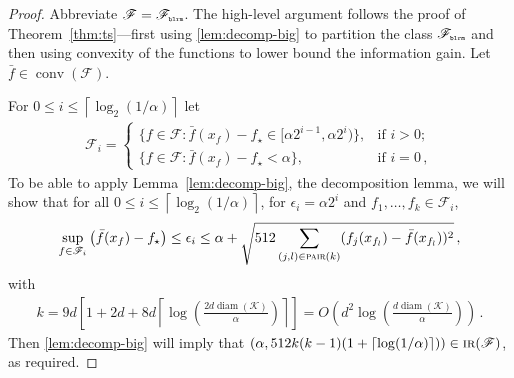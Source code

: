 \documentclass[letter, 12pt]{report}
\newcommand{\pr}{\text{\tiny\texttt{r}}}
\newcommand{\pb}{\text{\tiny\texttt{b}}}
\newcommand{\pl}{\text{\tiny\texttt{l}}}
\renewcommand{\pm}{\text{\tiny\texttt{m}}}
\newcommand{\ceil}[1]{\left\lceil #1 \right\rceil}
\newcommand{\pair}{\operatorname{\textsc{pair}}}
\newcommand{\cK}{\mathcal K}
\newcommand{\sF}{\mathscr F}
\newcommand{\conv}{\operatorname{conv}}
\newcommand{\diam}{\operatorname{diam}}
\newcommand{\1}{\mathbf{1}}
\newcommand{\IR}{\operatorname{\textsc{ir}}}
\theoremstyle{plain}
\theoremstyle{definition}
\theoremstyle{remark}
\begin{document}
\begin{proof}
    Abbreviate $\sF = \sF_{\pb\pl\pr\pm}$.
    The high-level argument follows the proof of Theorem~\ref{thm:ts}---first using \cref{lem:decomp-big} to partition the class $\sF_{\pb\pl\pr\pm}$ and then using convexity of the functions to lower bound the information gain.
    Let $\bar{f} \in \conv(\sF)$.

    For $0 \leq i \leq \ceil{\log_2(1/\alpha)}$ let
    \begin{align*}
        \sF_i = \begin{cases}
                    \{f \in \sF : \bar f(x_f) - f_\star \in [\alpha 2^{i-1}, \alpha 2^{i})\}, & \text{if } i > 0;    \\
                    \{f \in \sF : \bar f(x_f) - f_\star < \alpha\},                           & \text{if } i = 0 \,,
                \end{cases}
    \end{align*}
    To be able to apply Lemma~\ref{lem:decomp-big}, the decomposition lemma, we will show that for all $0 \leq i \leq \ceil{\log_2(1/\alpha)}$,
    for $\epsilon_i = \alpha 2^i$ and $f_1,\ldots,f_k \in \sF_i$,
    \begin{align}
        \sup_{f \in \sF_i} \left(\bar f(x_f) - f_\star\right) \leq \epsilon_i \leq \alpha + \sqrt{512 \sum_{(j, l) \in \pair(k)} (f_j(x_{f_l}) - \bar f(x_{f_l}))^2}\,,
        \label{eq:ridge:condition}
    \end{align}
    with
    \begin{align*}
        k = 9d\left[1 + 2d + 8d\ceil{\log\left(\frac{2d \diam(\cK)}{\alpha}\right)}\right] = O\left(d^2 \log\left(\frac{d \diam(\cK)}{\alpha}\right)\right) \,.
    \end{align*}
    Then \cref{lem:decomp-big} will imply that $(\alpha, 512k(k-1) (1 + \ceil{\log(1/\alpha)})) \in \IR(\sF)$, as required.


\end{proof}
\end{document}

